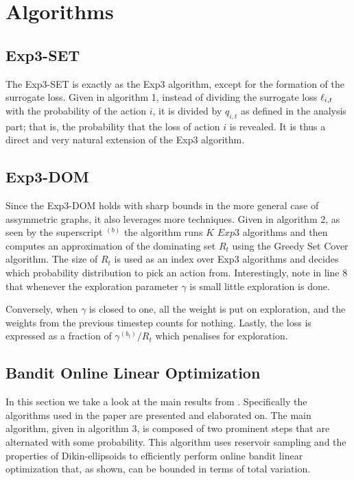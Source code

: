 \section{Algorithms}

\subsection{Exp3-SET}
The Exp3-SET is exactly as the Exp3 algorithm, except for the formation of the surrogate loss. Given in algorithm 1, instead of dividing the surrogate loss $\ell_{i,t}$ with the probability of the action $i$, it is divided by $q_{i,t}$ as defined in the analysis part; that is, the probability that the loss of action $i$ is revealed. It is thus a direct and very natural extension of the Exp3 algorithm. 

\subsection{Exp3-DOM}
Since the Exp3-DOM holds with sharp bounds in the more general case of assymmetric graphs, it also leverages more techniques. Given in algorithm 2, as seen by the superscript ${}^{(b)}$ the algorithm runs $K$ $Exp3$ algorithms and then computes an approximation of the dominating set $R_t$ using the Greedy Set Cover algorithm. The size of $R_t$ is used as an index over Exp3 algorithms and decides which probability distribution to pick an action from. Interestingly, note in line 8 that whenever the exploration parameter $\gamma$ is small little exploration is done.

Conversely, when $\gamma$ is closed to one, all the weight is put on exploration, and the weights from the previous timestep counts for nothing. Lastly, the loss is expressed as a fraction of $\gamma^{(b_t)}/R_t$ which penalises for exploration. 


\unskip

\unskip

\subsection{Bandit Online Linear Optimization}
In this section we take a look at the main results from \citep{hazan}.
Specifically  the algorithms used in the paper are presented and elaborated on.
The main algorithm, given in algorithm 3, is composed of two prominent steps that are alternated with 
some probability. This algorithm uses reservoir sampling and the 
properties of Dikin-ellipsoids to efficiently perform online bandit linear
optimization that, as shown, can be bounded in terms of total variation.

